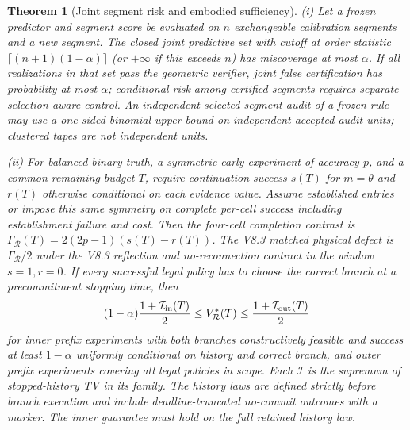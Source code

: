 \documentclass[11pt]{article}
\newtheorem{theorem}{Theorem}
\begin{document}
\begin{theorem}[Joint segment risk and embodied sufficiency]\label{thm:risk}
\textnormal{(i)} Let a frozen predictor and segment score be evaluated on
$n$ exchangeable calibration segments and a new segment. The closed joint
predictive set with cutoff at order statistic
$\lceil(n+1)(1-\alpha)\rceil$ (or $+\infty$ if this exceeds $n$) has
miscoverage at most $\alpha$. If all realizations in that set pass the
geometric verifier, joint false certification has probability at most
$\alpha$; conditional risk among certified segments requires separate
selection-aware control.
An independent selected-segment audit of a frozen rule may use a one-sided
binomial upper bound on independent accepted audit units; clustered tapes
are not independent units.

\textnormal{(ii)} For balanced binary truth, a symmetric early experiment of
accuracy $p$, and a common remaining budget $T$, require continuation success
$s(T)$ for $m=\theta$ and $r(T)$ otherwise conditional on \emph{each}
evidence value. Assume established entries or impose this same symmetry on
complete per-cell success including establishment failure and cost. Then
the four-cell completion contrast is
$\Gamma_{\mathcal R}(T)=2(2p-1)(s(T)-r(T))$. The V8.3 matched physical defect
is $\Gamma_{\mathcal R}/2$ under the V8.3 reflection and no-reconnection
contract in the window $s=1,r=0$. If every successful legal policy has to
choose the correct branch at a precommitment stopping time, then
\[
 (1-\alpha)\frac{1+\mathcal I_{\rm in}(T)}2
 \le V^*_{\mathcal R}(T)\le\frac{1+\mathcal I_{\rm out}(T)}2
\]
for inner prefix experiments with both branches constructively feasible and
success at least $1-\alpha$ uniformly conditional on history and correct
branch, and outer prefix experiments covering all legal policies in scope.
Each $\mathcal I$ is the supremum of stopped-history TV in its family.
The history laws are defined strictly before branch execution and include
deadline-truncated no-commit outcomes with a marker. The inner guarantee
must hold on the full retained history law.
\end{theorem}
\end{document}

